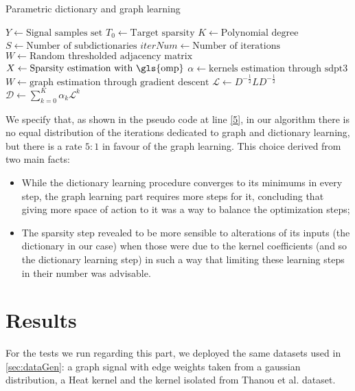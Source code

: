 \begin{algorithm}[htbp]
\label{alg:GDSimple}
  \caption{Parametric dictionary and graph learning}
  \begin{algorithmic}[1]
      \State $Y \gets \text{Signal samples set}$
      \State $T_0\gets \text{Target sparsity}$
      \State $K \gets \text{Polynomial degree}$
      \State $S \gets \text{Number of subdictionaries}$
      \State $iterNum \gets \text{Number of iterations}$
      \State $W \gets \text{Random thresholded adjacency matrix}$
    \EndProcedure
        \State $X \gets \text{Sparsity estimation with \gls{omp}}$
      \EndProcedure
         \label{5}
          \State $\alpha \gets \text{kernels estimation through sdpt3}$
        \Else
          \State $W \gets \text{graph estimation through gradient descent}$
          \State $\mathcal{L} \gets D^{-\frac{1}{2}}LD^{-\frac{1}{2}}$
        \EndIf
      \EndProcedure
        \State $\mathcal{D} \gets \sum_{k=0}^K \alpha_k \mathcal{L}^k$
      \EndProcedure
    \EndFor
    \end{algorithmic}
\end{algorithm}

We specify that, as shown in the pseudo code at line \ref{5}, in our algorithm there is no equal distribution of the iterations dedicated to graph and dictionary learning, but there is a rate $5:1$ in favour of the graph learning. This choice derived from two main facts:
\begin{itemize}
\item While the dictionary learning procedure converges to its minimums in every step, the graph learning part requires more steps for it, concluding that giving more space of action to it was a way to balance the optimization steps;
\item The sparsity step revealed to be more sensible to alterations of its inputs (the dictionary in our case) when those were due to the kernel coefficients (and so the dictionary learning step) in such a way that limiting these learning steps in their number was advisable.
\end{itemize}

\section{Results}
For the tests we run regarding this part, we deployed the same datasets used in \autoref{sec:dataGen}: a graph signal with edge weights taken from a gaussian distribution, a Heat kernel and the kernel isolated from Thanou et al. dataset.

